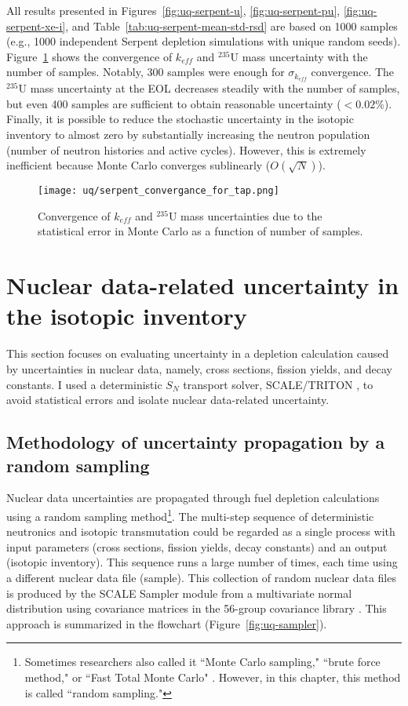 All results presented in Figures~\ref{fig:uq-serpent-u},  
\ref{fig:uq-serpent-pu}, \ref{fig:uq-serpent-xe-i}, and  
Table~\ref{tab:uq-serpent-mean-std-rsd} are based on 1000 samples (e.g., 1000 
independent Serpent depletion simulations with unique random seeds). 
Figure~\ref{fig:uq-serpent-convergence} shows the 
convergence of $k_{eff}$ and $^{235}$U mass uncertainty with the number of 
samples. Notably, 300 samples were enough for $\sigma_{k_{eff}}$ convergence. 
The $^{235}$U mass uncertainty at the \gls{EOL} decreases steadily 
with the number of samples, but even 400 samples are sufficient to obtain 
reasonable uncertainty ($<0.02$\%). 
Finally, it is possible to reduce the stochastic uncertainty in the isotopic 
inventory to almost zero by substantially increasing the neutron population 
(number of neutron histories and active cycles). However, this is extremely 
inefficient because Monte Carlo converges sublinearly ($O(\sqrt{N})$).
\begin{figure}[htp!] %
	\centering
	\texttt{[image: uq/serpent\_convergance\_for\_tap.png]}
	\caption{Convergence of $k_{eff}$ and $^{235}$U mass uncertainties due to 
	the statistical error in Monte Carlo as a function of number of samples.}
	\label{fig:uq-serpent-convergence}
\end{figure}
\FloatBarrier


\section{Nuclear data-related uncertainty in the isotopic inventory}
This section focuses on evaluating uncertainty in a depletion calculation 
caused by uncertainties in nuclear data, namely, cross sections, fission 
yields, and decay constants. I used a deterministic $S_N$ transport solver, 
SCALE/TRITON \cite{rearden_scale_2018}, to avoid statistical errors and 
isolate nuclear data-related uncertainty.

\subsection{Methodology of uncertainty propagation by a random sampling}
Nuclear data uncertainties are propagated through fuel depletion calculations 
using a random sampling method\footnote{Sometimes researchers also 
called it ``Monte Carlo sampling," \cite{radaideh_using_2019} ``brute 
force method,"\cite{garcia-herranz_propagation_2008} or ``Fast Total Monte 
Carlo" \cite{rochman_nuclear_2014}. However, in this chapter, this method is 
called ``random  sampling."}. The multi-step sequence of deterministic 
neutronics and isotopic transmutation could be regarded as a single 
process with input parameters (cross sections, fission yields, decay 
constants) and an output (isotopic inventory). This sequence runs a 
large number of times, each time using a different nuclear data file (sample). 
This collection of random nuclear data files is produced by the SCALE Sampler 
module from a multivariate normal distribution using covariance matrices in 
the 56-group covariance library \cite{rearden_scale_2018, 
radaideh_novel_2019}. This approach is summarized in the flowchart 
(Figure~\ref{fig:uq-sampler}).

